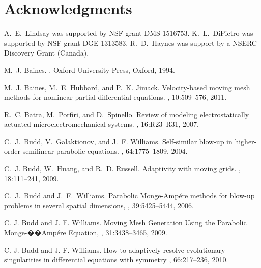 \documentclass{siamart0516}
\theoremstyle{plain}%
\theoremstyle{definition}
\theoremstyle{remark}
\begin{document}
\vspace{10pt}

\section*{Acknowledgments}
A.~E.~Lindsay was supported by NSF grant DMS-1516753.  K.~L.~DiPietro was supported by NSF grant DGE-1313583. R.~D.~Haynes was support by a NSERC Discovery Grant (Canada).

\vspace{10pt}

\begin{thebibliography}{10}

%
%
%

M.~J. Baines.
.
\newblock Oxford University Press, Oxford, 1994.

M.~J. Baines, M.~E. Hubbard, and P.~K. Jimack.
\newblock Velocity-based moving mesh methods for nonlinear partial differential
  equations.
, 10:509--576, 2011.

R.~C. Batra, M.~Porfiri, and D.~Spinello.
\newblock Review of modeling electrostatically actuated microelectromechanical systems.
, 16:R23--R31, 2007.

C.~J.~Budd, V.~Galaktionov, and J.~F. Williams.
\newblock Self-similar blow-up in higher-order semilinear parabolic equations.
, 64:1775--1809, 2004.

C.~J. Budd, W.~Huang, and R.~D. Russell.
\newblock Adaptivity with moving grids.
, 18:111--241, 2009.

C.~J.~Budd and J.~F.~Williams.
\newblock Parabolic {M}onge-{A}mp\'{e}re methods for blow-up problems in several spatial dimensions,
, 39:5425--5444, 2006.

C. J. Budd and J. F. Williams.
\newblock Moving Mesh Generation Using the Parabolic {M}onge-�{�A}mp\'{e}re Equation,
, 31:3438--3465, 2009.

C. J. Budd and J. F. Williams.
\newblock How to adaptively resolve evolutionary singularities in differential equations with symmetry
, 66:217--236, 2010.


\end{thebibliography}
\end{document}
